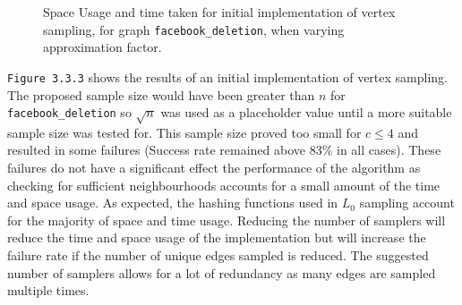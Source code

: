 \documentclass[11pt,twoside,a4paper]{report}
\begin{document}
\begin{figure}[H]
	\label{Figure 14}
	\caption{Space Usage and time taken for initial implementation of vertex sampling, for graph \texttt{facebook\_deletion}, when varying approximation factor.}
\end{figure}

\texttt{Figure 3.3.3} shows the results of an initial implementation of vertex sampling. The proposed sample size would have been greater than $n$ for \texttt{facebook\_deletion} so $\sqrt{n}$ was used as a placeholder value until a more suitable sample size was tested for. This sample size proved too small for $c\leq4$ and resulted in some failures (Success rate remained above $83\%$ in all cases). These failures do not have a significant effect the performance of the algorithm as checking for sufficient neighbourhoods accounts for a small amount of the time and space usage. As expected, the hashing functions used in $L_0$ sampling account for the majority of space and time usage. Reducing the number of samplers will reduce the time and space usage of the implementation but will increase the failure rate if the number of unique edges sampled is reduced. The suggested number of samplers allows for a lot of redundancy as many edges are sampled multiple times.
\end{document}
